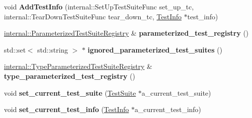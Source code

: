 \begin{DoxyCompactItemize}
\item 
\mbox{\label{classtesting_1_1internal_1_1UnitTestImpl_aa44354fe079a4140ce70c1b6ad7832fb}} 
void {\bfseries Add\+Test\+Info} (internal\+::\+Set\+Up\+Test\+Suite\+Func set\+\_\+up\+\_\+tc, internal\+::\+Tear\+Down\+Test\+Suite\+Func tear\+\_\+down\+\_\+tc, \mbox{\hyperlink{classtesting_1_1TestInfo}{Test\+Info}} $\ast$test\+\_\+info)
\item 
\mbox{\label{classtesting_1_1internal_1_1UnitTestImpl_a7ec0774316ff670f3701903e0e817e59}} 
\mbox{\hyperlink{classtesting_1_1internal_1_1ParameterizedTestSuiteRegistry}{internal\+::\+Parameterized\+Test\+Suite\+Registry}} \& {\bfseries parameterized\+\_\+test\+\_\+registry} ()
\item 
\mbox{\label{classtesting_1_1internal_1_1UnitTestImpl_a1354720ebb90cc2ca044bb393f50f357}} 
std\+::set$<$ std\+::string $>$ $\ast$ {\bfseries ignored\+\_\+parameterized\+\_\+test\+\_\+suites} ()
\item 
\mbox{\label{classtesting_1_1internal_1_1UnitTestImpl_a54441174e71696a583fb174e67dd9246}} 
\mbox{\hyperlink{classtesting_1_1internal_1_1TypeParameterizedTestSuiteRegistry}{internal\+::\+Type\+Parameterized\+Test\+Suite\+Registry}} \& {\bfseries type\+\_\+parameterized\+\_\+test\+\_\+registry} ()
\item 
\mbox{\label{classtesting_1_1internal_1_1UnitTestImpl_abe8dee80b17fe7d399ca95f048012571}} 
void {\bfseries set\+\_\+current\+\_\+test\+\_\+suite} (\mbox{\hyperlink{classtesting_1_1TestSuite}{Test\+Suite}} $\ast$a\+\_\+current\+\_\+test\+\_\+suite)
\item 
\mbox{\label{classtesting_1_1internal_1_1UnitTestImpl_ab72211c99ce4427dfb472d6ecea62989}} 
void {\bfseries set\+\_\+current\+\_\+test\+\_\+info} (\mbox{\hyperlink{classtesting_1_1TestInfo}{Test\+Info}} $\ast$a\+\_\+current\+\_\+test\+\_\+info)
\item 
\mbox{\label{classtesting_1_1internal_1_1UnitTestImpl_af84d2515f1a272a8783f00a3e8c0aff8}} 

\end{DoxyCompactItemize}
